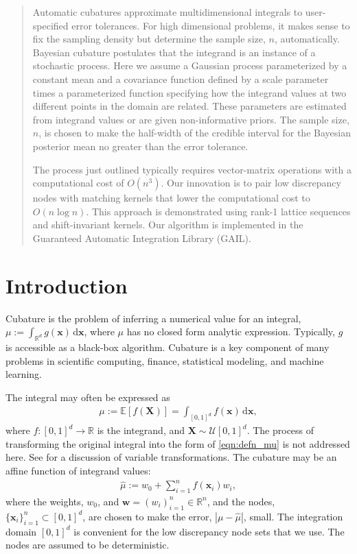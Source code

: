\documentclass[twocolumn]{svjour3}          %
\newcommand{\bm}[1]{\boldsymbol{#1}}
\newcommand{\dif}[1]{\text{d}{#1}}
\newcommand{\reals}{\mathbb{R}}
\newcommand{\Ex}{\mathbb{E}}
\newcommand{\vw}{\bm{w}}
\newcommand{\vx}{\bm{x}}
\newcommand{\hmu}{\widehat{\mu}}
\def\abs#1{\ensuremath{\left \lvert #1 \right \rvert}}
\begin{document}
\begin{abstract}
Automatic cubatures approximate multidimensional integrals to user-specified error tolerances.  For high dimensional problems, it makes sense to fix the sampling density but determine the 
sample size, $n$, automatically. Bayesian cubature postulates that the integrand is an instance of a stochastic process.  Here we assume a Gaussian process parameterized by a constant mean and a covariance function defined by a scale parameter times a parameterized function specifying how the integrand values at two different points in the domain are related.
These parameters are estimated from integrand values or are given non-informative priors.  The sample size, $n$, is chosen to make the half-width of the credible interval for the Bayesian posterior mean no greater than the error tolerance. 

The process just outlined typically requires vector-matrix operations  with a computational cost of $O(n^3)$. Our innovation is to pair low discrepancy nodes with matching kernels that lower the  computational cost to $O(n \log n)$.   This approach is demonstrated using rank-1 lattice sequences and shift-invariant kernels.  Our algorithm is  implemented in the Guaranteed Automatic Integration Library (GAIL).


\end{abstract}

\section{Introduction}
\label{intro}
Cubature is the problem of inferring a numerical value for an integral, 
$ \mu := \int_{\reals^d} g(\vx) \, \dif \vx$, where $\mu$ has no closed form analytic expression. Typically, $g$ is accessible as a black-box algorithm. 
Cubature is a key component of many problems in scientific computing, finance, statistical modeling, and machine learning.  

The integral may often be expressed as
\begin{align}
\label{eqn:defn_mu}
\mu:= \Ex[f(\boldsymbol{X})] = \int_{[0,1]^d} f(\vx)\, \dif\vx, 
\end{align}
where $f:[0,1]^d \to \reals$ is the integrand, and $\boldsymbol{X} \sim \mathcal{U}[0,1]^d$.  The process of transforming the original integral into the form of \eqref{eqn:defn_mu} is not addressed here. See \cite[Section 2.11]{DicEtal14a} 
for a discussion of variable transformations. The cubature may be an affine function of integrand values:
\begin{align}
\label{eqn:defn_hmu}  %
\hmu := w_0 + \sum_{i=1}^{n} f(\vx_i) w_i,
\end{align}
where the weights, $w_0$, and  $\vw = (w_i)_{i=1}^n \in \reals^n$, and the nodes, $\{\vx_i\}_{i=1}^n \subset [0,1]^d$, are chosen to make the error, $\abs{\mu - \hmu}$, small. The integration domain $[0,1]^d$ is convenient for the low discrepancy node sets \cite{DicEtal14a,SloJoe94} that we use.  The nodes are assumed to be deterministic.
\end{document}
